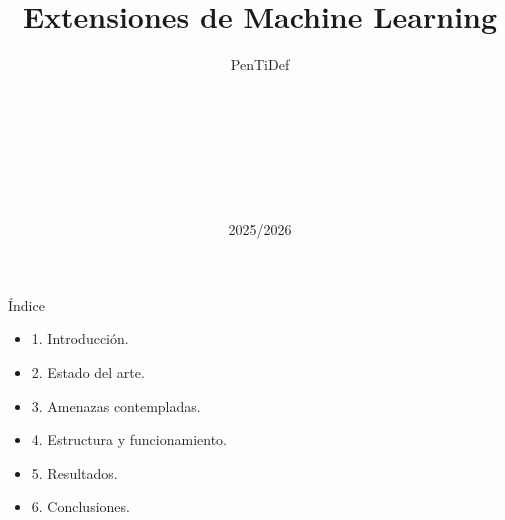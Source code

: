 \documentclass[10pt, envcountsect, presentation, aspectratio=169]{beamer}
\title[PenTiDef]{Extensiones de Machine Learning}
\subtitle{PenTiDef}
\author[G. Carmona, V. Saura, F.J. Cortes]
{%
	\sc{Víctor Saura Meseguer}\\
	\\
	\sc{Francisco José Cortes Delgado}\\
	\\
    \sc{Guillermo Carmona Martínez}\\
    \\
}
\institute[UMU]
{
	\textit{Universidad de Murcia}
}
\date{2025/2026}
\begin{document}
\begin{frame}[plain]
	\titlepage
\end{frame}

\begin{frame}{Índice}{}
	\begin{itemize}
		\item 1. Introducción.
        \item 2. Estado del arte.
        \item 3. Amenazas contempladas.
        \item 4. Estructura y funcionamiento.
        \item 5. Resultados. 
        \item 6. Conclusiones.
	\end{itemize}
\end{frame}






\end{document}
